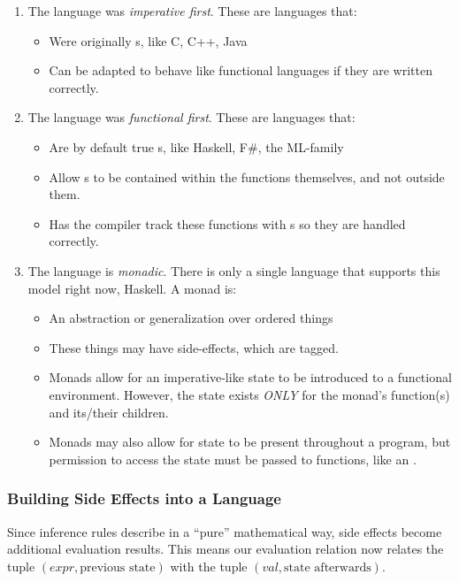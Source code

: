 \begin{enumerate}[noitemsep]
\item The language was \emph{imperative first}.
  These are languages that:
  \begin{itemize}[noitemsep]
  \item Were originally s, like C, C++, Java
  \item Can be adapted to behave like functional languages if they are written correctly.
  \end{itemize}
\item The language was \emph{functional first}.
  These are languages that:
  \begin{itemize}[noitemsep]
  \item Are by default true s, like Haskell, F\#, the ML-family
  \item Allow s to be contained within the functions themselves, and not outside them.
  \item Has the compiler track these functions with s so they are handled correctly.
  \end{itemize}
\item The language is \emph{monadic}.
  There is only a single language that supports this model right now, Haskell.
  A monad is:
  \begin{itemize}[noitemsep]
  \item An abstraction or generalization over ordered things
  \item These things may have side-effects, which are tagged.
  \item Monads allow for an imperative-like state to be introduced to a functional environment. However, the state exists \emph{ONLY} for the monad's function(s) and its/their children.
  \item Monads may also allow for state to be present throughout a program, but permission to access the state must be passed to functions, like an .
  \end{itemize}
\end{enumerate}

\subsubsection{Building Side Effects into a Language}\label{subsubsec:Building_Side_Effects_to_Language}
Since inference rules describe  in a ``pure'' mathematical way, side effects become additional evaluation results.
This means our evaluation relation now relates the tuple $(expr, \text{previous state})$ with the tuple $(val, \text{state afterwards})$.

